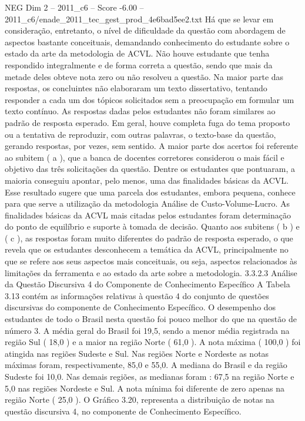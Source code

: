 \begin{textsample}{NEG Dim 2 – 2011\_c6 – Score -6.00 – 2011\_c6/enade\_2011\_tec\_gest\_prod\_4e6bad5ee2.txt}
Há que se levar em consideração, entretanto, o nível de dificuldade da questão com abordagem de aspectos bastante conceituais, demandando conhecimento do estudante sobre o estado da arte da metodologia de ACVL.
Não houve estudante que tenha respondido integralmente e de forma correta a questão, sendo que mais da metade deles obteve nota zero ou não resolveu a questão.
Na maior parte das respostas, os concluintes não elaboraram um texto dissertativo, tentando responder a cada um dos tópicos solicitados sem a preocupação em formular um texto contínuo.
As respostas dadas pelos estudantes não foram similares ao padrão de resposta esperado.
Em geral, houve completa fuga do tema proposto ou a tentativa de reproduzir, com outras palavras, o texto-base da questão, gerando respostas, por vezes, sem sentido.
A maior parte dos acertos foi referente ao subitem ( a ), que a banca de docentes corretores considerou o mais fácil e objetivo das três solicitações da questão.
Dentre os estudantes que pontuaram, a maioria conseguiu apontar, pelo menos, uma das finalidades básicas da ACVL.
Esse resultado sugere que uma parcela dos estudantes, embora pequena, conhece para que serve a utilização da metodologia Análise de Custo-Volume-Lucro.
As finalidades básicas da ACVL mais citadas pelos estudantes foram determinação do ponto de equilíbrio e suporte à tomada de decisão.
Quanto aos subitens ( b ) e ( c ), as respostas foram muito diferentes do padrão de resposta esperado, o que revela que os estudantes desconhecem a temática da ACVL, principalmente no que se refere aos seus aspectos mais conceituais, ou seja, aspectos relacionados às limitações da ferramenta e ao estado da arte sobre a metodologia. 3.3.2.3 Análise da Questão Discursiva 4 do Componente de Conhecimento Específico A Tabela 3.13 contém as informações relativas à questão 4 do conjunto de questões discursivas do componente de Conhecimento Específico.
O desempenho dos estudantes de todo o Brasil nesta questão foi pouco melhor do que na questão de número 3.
A média geral do Brasil foi 19,5, sendo a menor média registrada na região Sul ( 18,0 ) e a maior na região Norte ( 61,0 ).
A nota máxima ( 100,0 ) foi atingida nas regiões Sudeste e Sul.
Nas regiões Norte e Nordeste as notas máximas foram, respectivamente, 85,0 e 55,0.
A mediana do Brasil e da região Sudeste foi 10,0.
Nas demais regiões, as medianas foram : 67,5 na região Norte e 5,0 nas regiões Nordeste e Sul.
A nota mínima foi diferente de zero apenas na região Norte ( 25,0 ).
O Gráfico 3.20, representa a distribuição de notas na questão discursiva 4, no componente de Conhecimento Específico.

\end{textsample}
